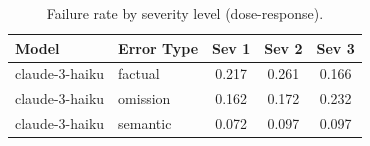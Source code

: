 \begin{table}[t]
\centering
\caption{Failure rate by severity level (dose-response).}
\label{tab:severity}
\begin{tabular}{llccc}
\toprule
Model & Error Type & Sev 1 & Sev 2 & Sev 3 \\
\midrule
claude-3-haiku & factual & 0.217 & 0.261 & 0.166 \\
claude-3-haiku & omission & 0.162 & 0.172 & 0.232 \\
claude-3-haiku & semantic & 0.072 & 0.097 & 0.097 \\
\bottomrule
\end{tabular}
\end{table}